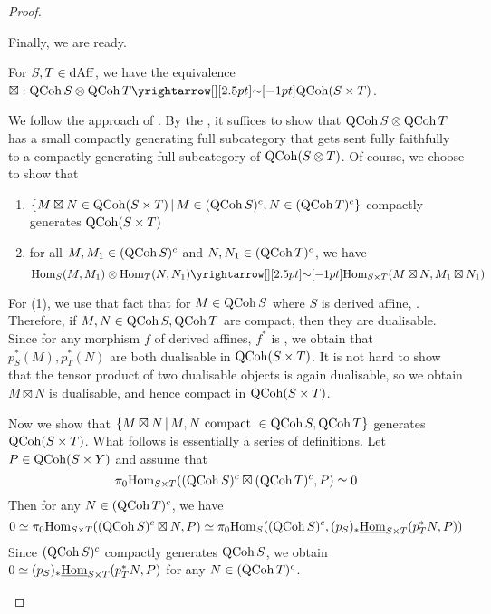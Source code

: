 \documentclass[./main.tex]{subfiles}
\begin{document}
\begin{proof}
\begin{lem}[GR1 Ch1 7.4.2]
\begin{proof1}
    \end{proof1}
  \end{lem}
  Finally, we are ready.
  \begin{lem}
    For $S , T \in \mathrm{dAff}$, 
    we have the equivalence $\boxtimes : 
    \QCOH\,S \otimes \QCOH\,T \map{\sim}{} \QCOH(S \times T)$.
    \begin{proof1}
      We follow the approach of \cite[Prop 4.6]{BZFN}.
      By the ,
      it suffices to show that $\mathrm{QCoh}\,S \otimes \mathrm{QCoh}\,T$
      has a small compactly generating full subcategory that
      gets sent fully faithfully to a compactly generating full subcategory
      of $\mathrm{QCoh}(S \otimes T)$.
      Of course, we choose to show that
      \begin{enumerate}
        \item $\left\{M \boxtimes N \in \mathrm{QCoh}(S \times T) \,|\, 
        M \in (\mathrm{QCoh}\,S)^c , N \in (\mathrm{QCoh}\,T)^c\right\}$ compactly generates
        $\mathrm{QCoh}(S \times T)$
        \item for all $M, M_1 \in (\mathrm{QCoh}\,S)^c$ and $N , N_1 \in (\mathrm{QCoh}\,T)^c$,
        we have \[
          \HOM_S(M , M_1) \otimes \HOM_T(N , N_1) \map{\sim}{}
          \HOM_{S \times T}(M \boxtimes N , M_1 \boxtimes N_1)  
        \]
      \end{enumerate}
      For (1), we use that fact that 
      for $M \in \mathrm{QCoh}\,S$ where $S$ is derived affine, 
      .
      Therefore, if $M, N \in \mathrm{QCoh}\,S , \mathrm{QCoh}\,T$ are compact,
      then they are dualisable.
      Since for any morphism $f$ of derived affines, 
      $f^*$ is ,
      we obtain that $p_S^*(M), p_T^*(N)$ are both dualisable in
      $\mathrm{QCoh}(S \times T)$.
      It is not hard to show that the tensor product of two dualisable objects
      is again dualisable, so we obtain $M \boxtimes N$ is dualisable,
      and hence compact in $\mathrm{QCoh}(S \times T)$.

      Now we show that $\left\{M \boxtimes N \,|\, M, N \text{ compact } \in 
      \mathrm{QCoh}\,S , \mathrm{QCoh}\,T\right\}$ generates $\mathrm{QCoh}(S \times T)$.
      What follows is essentially a series of definitions.
      Let $P \in \mathrm{QCoh}(S \times Y)$ and assume that
      \[
        \pi_0 \mathrm{Hom}_{S\times T}((\mathrm{QCoh}\,S)^c \boxtimes (\mathrm{QCoh}\,T)^c , P) \simeq 0
      \]
      Then for any $N \in (\mathrm{QCoh}\,T)^c$, we have 
      \[
        0 \simeq \pi_0\mathrm{Hom}_{S \times T}((\mathrm{QCoh}\,S)^c \boxtimes N , P)
        \simeq \pi_0\mathrm{Hom}_S((\mathrm{QCoh}\,S)^c , 
          (p_S)_*\underline{\mathrm{Hom}}_{S \times T}(p_T^* N , P))
      \]
      Since $(\mathrm{QCoh}\,S)^c$ compactly generates $\mathrm{QCoh}\,S$,
      we obtain $0 \simeq (p_S)_*\underline{\mathrm{Hom}}_{S \times T}(p_T^* N , P)$ 
      for any $N \in (\mathrm{QCoh}\,T)^c$.


\end{proof1}
\end{lem}
\end{proof}
\end{document}
